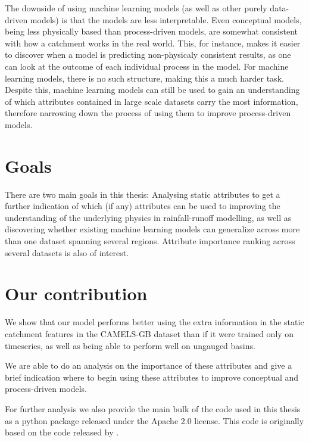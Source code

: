 The downside of using machine learning models (as well as other purely data-driven 
models) is that the models are less interpretable. Even conceptual models, being 
less physically based than process-driven models, are somewhat consistent with 
how a catchment works in the real world. This, for instance, makes it easier to 
discover when a model is predicting non-physicaly consistent results, as one 
can look at the outcome of each individual process in the model. For machine learning 
models, there is no such structure, making this a much harder task.
Despite this, machine learning models 
can still be used to gain an understanding of which attributes contained in 
large scale datasets carry the most information, therefore narrowing down the 
process of using them to improve process-driven models.
\section{Goals}
There are two main goals in this thesis: Analysing static attributes to get a 
further indication of which (if any) attributes can be used to improving the 
understanding of the underlying physics in rainfall-runoff modelling, as well 
as discovering whether existing machine learning models can generalize across 
more than one dataset spanning several regions. Attribute importance ranking 
across several datasets is also of interest.

\section{Our contribution}
We show that our model performs better using the extra information in the static 
catchment features in the CAMELS-GB \citep{CAMELS_GB} dataset than if it were trained 
only on timeseries, as well as being able to perform well on ungauged basins.

We are able to do an analysis on the importance of these attributes and give a brief 
indication where to begin using these attributes to improve conceptual and process-driven 
models.

For further analysis we also provide the main bulk of 
the code used in this thesis as a python package released under the Apache 2.0 
license. This code is originally based on the code released by \citet{lstm_second_paper}.

